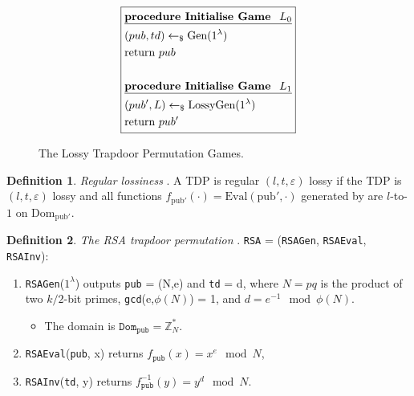 \documentclass[]{final_report}
\theoremstyle{definition}
\newtheorem{definition}{Definition}[chapter]
\begin{document}
\begin{figure}[H]
\[
\boxed{
\begin{aligned}
&\underline{\textbf{\text{procedure Initialise Game } \(L_0\)}} \\
&(pub, td) \leftarrow_\$ \text{Gen}(1^\lambda) \\
&\text{return } pub \\
\\
&\underline{\textbf{\text{procedure Initialise Game } \(L_1\)}} \\
&(pub', L) \leftarrow_\$ \text{LossyGen}(1^\lambda) \\
&\text{return } pub' \\
\end{aligned}
}
\]
\caption{The Lossy Trapdoor Permutation Games.}
\label{fig:lossy_trapdoor_permutation_games}
\end{figure}

\begin{definition}
\label{def:reg-los}
\textit{Regular lossiness} \cite{10.1145/1374376.1374406, kakvi2018optimal}. A TDP is regular \( (l, t, \varepsilon) \) lossy if the TDP is \( (l, t, \varepsilon) \) lossy and all functions \( f_{\text{pub}'}(\cdot) = \text{Eval}(\text{pub}', \cdot) \) generated by  are \( l \)-to-\( 1 \) on \( \text{Dom}_{\text{pub}'} \).
\end{definition}

\begin{definition} 
\textit{The RSA trapdoor permutation} \cite{kakvi2018optimal}. \texttt{RSA} = (\texttt{RSAGen}, \texttt{RSAEval}, \texttt{RSAInv}): 
\begin{enumerate}
\item \texttt{RSAGen}($1^\lambda$) outputs \texttt{pub} = (N,e) and \texttt{td} = d, where $N = pq$ is the product of two $k/2$-bit primes, \texttt{gcd}(e,$\phi(N)$) = 1, and $d = e^{-1} \mod \phi(N)$. 
\begin{itemize}
\item The domain is $\texttt{Dom}_{\texttt{pub}} = \mathbb{Z}_N^*$. 
\end{itemize}
\item \texttt{RSAEval}(\texttt{pub}, x) returns $f_{\texttt{pub}}(x) = x^e \mod N$, 
\item \texttt{RSAInv}(\texttt{td}, y) returns $f_{\texttt{pub}}^{-1}(y) = y^d \mod N$. 
\end{enumerate}

\end{definition} 
\end{document}
